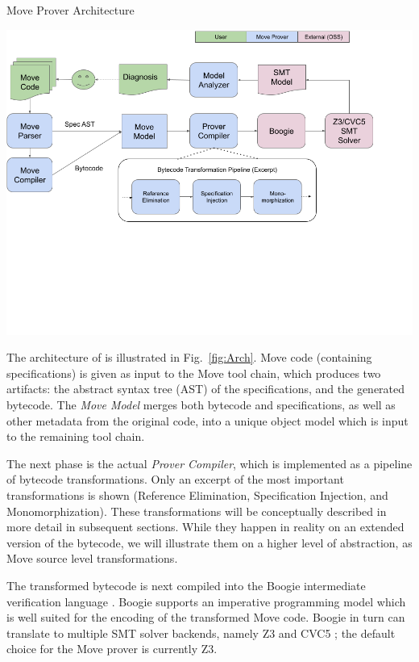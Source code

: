
\begin{Figure}
  \centering
  \caption{Move Prover Architecture}
  \label{fig:Arch}
  \includegraphics[trim=0 250 0 0, width=\textwidth]{arch.png}
\end{Figure}

The architecture of \MVP is illustrated in Fig.~\ref{fig:Arch}. Move code
(containing specifications) is given as input to the Move tool chain, which
produces two artifacts: the abstract syntax tree (AST) of the specifications,
and the generated bytecode.  The \emph{Move Model} merges both bytecode and
specifications, as well as other metadata from the original code, into a unique
object model which is input to the remaining tool chain.

The next phase is the actual \emph{Prover Compiler}, which is implemented as a
pipeline of bytecode transformations. Only an excerpt of the most important
transformations is shown (Reference Elimination, Specification Injection, and
Monomorphization). These transformations will be conceptually described in more
detail in subsequent sections. While they happen in reality on an extended
version of the bytecode, we will illustrate them on a higher level of
abstraction, as Move source level transformations.

The transformed bytecode is next compiled into the Boogie intermediate
verification language \cite{BOOGIE}. Boogie supports an imperative programming
model which is well suited for the encoding of the transformed Move code. Boogie
in turn can translate to multiple SMT solver backends, namely Z3 \cite{Z3} and
CVC5 \cite{CVC}; the default choice for the Move prover is currently Z3.

